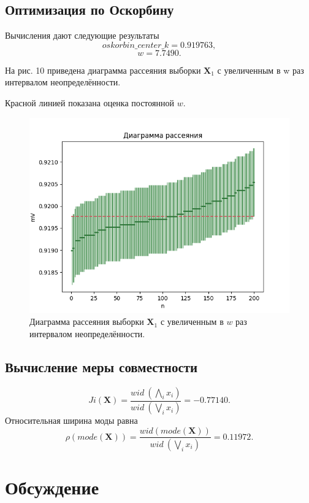 \documentclass{article}
\begin{document}
\subsection{Оптимизация по Оскорбину}
Вычисления дают следующие результаты
$$oskorbin\_center\_k = 0.919763,$$
$$w = 7.7490.$$

На рис. 10 приведена диаграмма рассеяния выборки $\textbf{X}_1$ с увеличенным в w раз интервалом неопределённости.

Красной линией показана оценка постоянной $w$.\\
\begin{figure}[H]
            \centering
		\includegraphics[width = 160 mm, height = 120 mm]{result5.png}
		\caption{ Диаграмма рассеяния выборки $\textbf{X}_1$ с увеличенным в $w$ раз
интервалом неопределённости.}
		\label{fig:six}
\end{figure}
\subsection{Вычисление меры совместности}
$$Ji(\textbf{X}) = \frac{wid\:(\bigwedge\limits_i x_i)}{wid\:(\bigvee\limits_i x_i)} 
= { -0.77140}.$$
Относительная ширина моды равна
$$\rho(mode(\textbf{X})) = \frac{wid(mode(\textbf{X}))}{wid\:(\bigvee\limits_i x_i)} = { 0.11972}.$$


\newpage
\section{Обсуждение}
\end{document}

